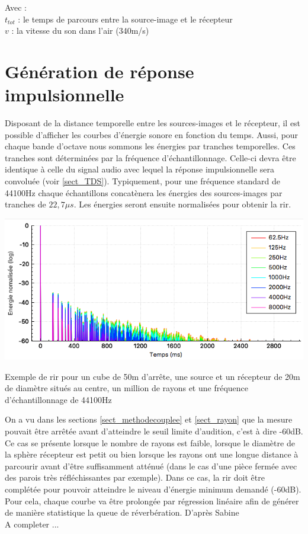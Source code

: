 Avec : \\
$ t_{tot}$ : le temps de parcours entre la source-image et le récepteur \\
$v$ : la vitesse du son dans l'air (340m/s)



\section{Génération de réponse impulsionnelle} \label{sect_rir}

Disposant de la distance temporelle entre les sources-images et le récepteur, il est possible d'afficher les courbes d'énergie sonore en fonction du temps. Aussi, pour chaque bande d'octave nous sommons les énergies par tranches temporelles. Ces tranches sont déterminées par la fréquence d'échantillonnage. Celle-ci devra être identique à celle du signal audio avec lequel la réponse impulsionnelle sera convoluée (voir \ref{sect_TDS}). Typiquement, pour une fréquence standard de 44100Hz chaque échantillons concatènera les énergies des sources-images par tranches de $22,7\mu s$. Les énergies seront ensuite normalisées pour obtenir la \gls{rir}.
 
 \begin{figureth}
	\includegraphics[width=0.9\linewidth]{images/rir}
	\caption{Exemple de \gls{rir} pour un cube de 50m d'arrête, une source et un récepteur de 20m de diamètre situés au centre, un million de rayons et une fréquence d'échantillonnage de 44100Hz}
\end{figureth}

On a vu dans les sections \ref{sect_methodecouplee} et \ref{sect_rayon} que la mesure pouvait être arrêtée avant d'atteindre le seuil limite d'audition, c'est à dire -60dB. Ce cas se présente lorsque le nombre de rayons est faible, lorsque le diamètre de la sphère récepteur est petit ou bien lorsque les rayons ont une longue distance à parcourir avant d'être suffisamment atténué (dans le cas d'une pièce fermée avec des parois très réfléchissantes par exemple). Dans ce cas, la \gls{rir} doit être complétée pour pouvoir atteindre le niveau d'énergie minimum demandé (-60dB). Pour cela, chaque courbe va être prolongée par régression linéaire afin de générer de manière statistique la queue de réverbération. D'après Sabine \cite[]{sabine} \\
A completer ...


